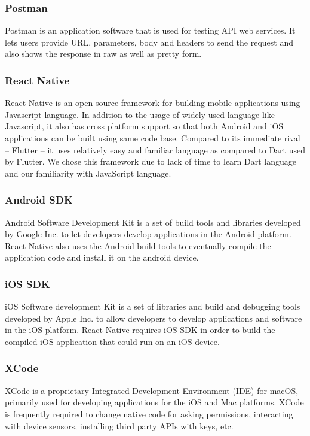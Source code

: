 \documentclass[12pt, a4paper, oneside]{article}
\begin{document}
\subsubsection{Postman}
Postman is an application software that is used for testing API web services. It lets users provide URL, parameters, body and headers to send the request and also shows the response in raw as well as pretty form.

\subsubsection{React Native}
React Native is an open source framework for building mobile applications using Javascript language. In addition to the usage of widely used language like Javascript, it also has cross platform support so that both Android and iOS applications can be built using same code base. Compared to its immediate rival -- Flutter -- it uses relatively easy and familiar language as compared to Dart used by Flutter. We chose this framework due to lack of time to learn Dart language and our familiarity with JavaScript language.

\subsubsection{Android SDK}
Android Software Development Kit is a set of build tools and libraries developed by Google Inc. to let developers develop applications in the Android platform. React Native also uses the Android build tools to eventually compile the application code and install it on the android device.

\subsubsection{iOS SDK}
iOS Software development Kit is a set of libraries and build and debugging tools developed by Apple Inc. to allow developers to develop applications and software in the iOS platform. React Native requires iOS SDK in order to build the compiled iOS application that could run on an iOS device.

\subsubsection{XCode}
XCode is a proprietary Integrated Development Environment (IDE) for macOS, primarily used for developing applications for the iOS and Mac platforms. XCode is frequently required to change native code for asking permissions, interacting with device sensors, installing third party APIs with keys, etc.
\end{document}
